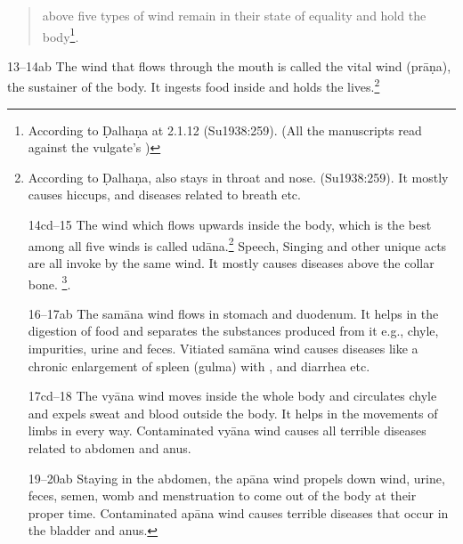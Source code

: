\begin{translation}
\begin{quote}
above five types of wind remain in their state of equality and hold the
body\footnote{According to Ḍalhaṇa  at 2.1.12 (Su1938:259).
(All the manuscripts read    against the vulgate's  )}.
\end{quote}

\item[13--14ab] The wind that flows through the mouth is called the
vital wind (prāṇa), the sustainer of the body. It ingests food inside and holds the lives.\footnote{According to Ḍalhaṇa,  also stays in throat and nose. (Su1938:259). It
mostly causes hiccups, and diseases related to breath etc.

\item[14cd--15] The wind which flows upwards inside the body, which is the best among
all five winds is called udāna.\footnote{According to Ḍalhaṇa, the places of udāna wind is not mentioned here but it flows in navel, stomach and throat. Su.1938:260} Speech, Singing and other unique acts are all invoke by the same wind. It mostly causes diseases above
the collar bone. \footnote{ Ḍalhaṇa
suggests that  means body parts above the collar bone e.g. eyes, face, nose, ears and head. It also causes diseases like cough etc. }.

\item [16--17ab] The samāna wind flows in stomach and duodenum. It helps
in the digestion of food and separates the substances
produced from it e.g., chyle, impurities, urine and feces. Vitiated
samāna wind causes diseases like a chronic enlargement of spleen (gulma) with
, and diarrhea etc.

\item[17cd--18] The vyāna wind moves inside the whole body and circulates
chyle and expels sweat and blood outside the body. It helps in the
movements of limbs in every way. Contaminated vyāna wind causes all terrible
diseases related to abdomen and anus.

\item[19--20ab] Staying in the abdomen, the apāna wind propels down wind,  urine, feces, semen, womb and menstruation to come out of the body
at their proper time. Contaminated apāna wind causes terrible diseases
that occur in the bladder and anus.

}
\end{translation}
